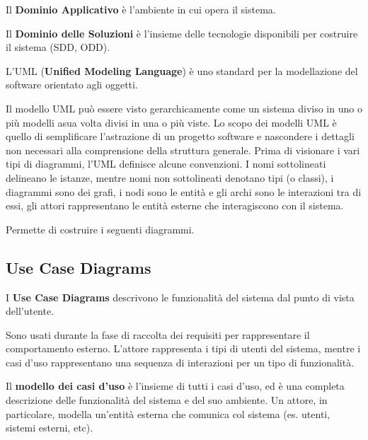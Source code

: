 \documentclass{article}
\begin{document}
    \vspace{3mm}
    
    Il \textbf{Dominio Applicativo} è l’ambiente in cui opera il sistema. 
    
    \vspace{3mm}
    
    Il \textbf{Dominio delle Soluzioni} è l’insieme delle tecnologie disponibili per costruire il sistema (SDD, ODD).
    
    \vspace{3mm}
    
    L'UML (\textbf{Unified Modeling Language}) è uno standard per la modellazione del software orientato agli oggetti. 
    
    Il modello UML può essere visto gerarchicamente come un sistema diviso in uno o più modelli asua volta divisi in una o più viste. Lo scopo dei modelli UML è quello di semplificare l’astrazione di un progetto software e nascondere i dettagli non necessari alla comprensione della struttura generale. Prima di visionare i vari tipi di diagrammi, l'UML definisce alcune convenzioni. I nomi sottolineati delineano le istanze, mentre nomi non sottolineati denotano tipi (o classi), i diagrammi sono dei grafi, i nodi sono le entità e gli archi sono le interazioni tra di essi, gli attori rappresentano le entità esterne che interagiscono con il sistema. 
    
    Permette di costruire i seguenti diagrammi.

    \subsection{Use Case Diagrams}
    
        I \textbf{Use Case Diagrams} descrivono le funzionalità del sistema dal punto di vista dell’utente. 
        
        \vspace{3mm}
        
        Sono usati durante la fase di raccolta dei requisiti per rappresentare il comportamento esterno. L’attore rappresenta i tipi di utenti del sistema, mentre i casi d’uso rappresentano una sequenza di interazioni per un tipo di funzionalità. 
        
        \vspace{3mm}
        
        Il \textbf{modello dei casi d’uso} è l’insieme di tutti i casi d’uso, ed è una completa descrizione delle funzionalità del sistema e del suo ambiente. Un attore, in particolare, modella un’entità esterna che comunica col sistema (es. utenti, sistemi esterni, etc). 
        
\end{document}
